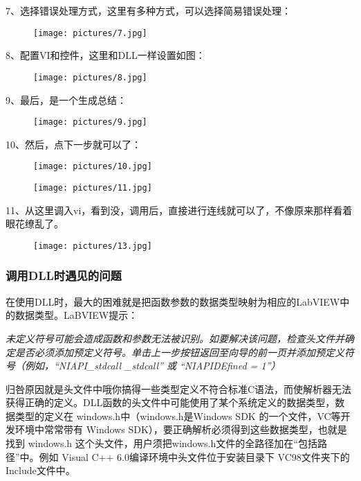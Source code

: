 7、选择错误处理方式，这里有多种方式，可以选择简易错误处理：
\begin{figure}[h!]
\centering
\texttt{[image: pictures/7.jpg]}
\end{figure}

8、配置VI和控件，这里和DLL一样设置如图：
\begin{figure}[h!]
\centering
\texttt{[image: pictures/8.jpg]}
\end{figure}

9、最后，是一个生成总结：
\begin{figure}[h!]
\centering
\texttt{[image: pictures/9.jpg]}
\end{figure}

10、然后，点下一步就可以了：
\begin{figure}[h!]
\centering
\texttt{[image: pictures/10.jpg]}
\end{figure}

\begin{figure}[h!]
\centering
\texttt{[image: pictures/11.jpg]}
\end{figure}


11、从这里调入vi，看到没，调用后，直接进行连线就可以了，不像原来那样看着眼花缭乱了。
\begin{figure}[h!]
\centering
\texttt{[image: pictures/13.jpg]}
\end{figure}


\subsubsection{调用DLL时遇见的问题}
在使用DLL时，最大的困难就是把函数参数的数据类型映射为相应的LabVIEW中的数据类型。LaBVIEW提示：

{\color{blue}\emph{未定义符号可能会造成函数和参数无法被识别。如要解决该问题，检查头文件并确定是否必须添加预定义符号。单击上一步按钮返回至向导的前一页并添加预定义符号（例如，“NIAPI\_stdcall \_stdcall” 或 ``NIAPIDEfined = 1''）} }

归咎原因就是头文件中哦你搞得一些类型定义不符合标准C语法，而使解析器无法获得正确的定义。DLL函数的头文件中可能使用了某个系统定义的数据类型，数据类型的定义在 windows.h中（windows.h是Windows SDK 的一个文件，VC等开发环境中常常带有 Windows SDK），要正确解析必须得到这些数据类型，也就是找到 windows.h 这个头文件，用户须把windows.h文件的全路径加在“包括路径”中。例如 Visual C++ 6.0编译环境中头文件位于安装目录下 VC98文件夹下的 Include文件中。


